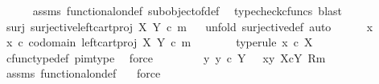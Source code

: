 \begin{isabellebody}
\ \ \ \ \isamarkupfalse%
\ assms\ functional{\isacharunderscore}{\kern0pt}on{\isacharunderscore}{\kern0pt}def\ subobject{\isacharunderscore}{\kern0pt}of{\isacharunderscore}{\kern0pt}def{}\ \isamarkupfalse%
\ {\isacharparenleft}{\kern0pt}typecheck{\isacharunderscore}{\kern0pt}cfuncs{\isacharcomma}{\kern0pt}\ blast{\isacharparenright}{\kern0pt}\isanewline
\ \ \isamarkupfalse%
\ surj{\isacharcolon}{\kern0pt}\ {\isachardoublequoteopen}surjective{\isacharparenleft}{\kern0pt}left{\isacharunderscore}{\kern0pt}cart{\isacharunderscore}{\kern0pt}proj\ X\ Y\ {\isasymcirc}\isactrlsub c\ m{\isacharparenright}{\kern0pt}{\isachardoublequoteclose}\isanewline
\ \ \isamarkupfalse%
{\isacharparenleft}{\kern0pt}unfold\ surjective{\isacharunderscore}{\kern0pt}def{\isacharcomma}{\kern0pt}\ auto{\isacharparenright}{\kern0pt}\isanewline
\ \ \ \ \isamarkupfalse%
\ x\ \isanewline
\ \ \ \ \isamarkupfalse%
\ {\isachardoublequoteopen}x\ {\isasymin}\isactrlsub c\ codomain\ {\isacharparenleft}{\kern0pt}left{\isacharunderscore}{\kern0pt}cart{\isacharunderscore}{\kern0pt}proj\ X\ Y\ {\isasymcirc}\isactrlsub c\ m{\isacharparenright}{\kern0pt}{\isachardoublequoteclose}\isanewline
\ \ \ \ \isamarkupfalse%
\ \isamarkupfalse%
\ {\isacharbrackleft}{\kern0pt}type{\isacharunderscore}{\kern0pt}rule{\isacharbrackright}{\kern0pt}{\isacharcolon}{\kern0pt}\ {\isachardoublequoteopen}x\ {\isasymin}\isactrlsub c\ X{\isachardoublequoteclose}\isanewline
\ \ \ \ \ \ \isamarkupfalse%
\ cfunc{\isacharunderscore}{\kern0pt}type{\isacharunderscore}{\kern0pt}def\ pi{}{\isacharunderscore}{\kern0pt}m{\isacharunderscore}{\kern0pt}type\ \isamarkupfalse%
\ force\isanewline
\ \ \ \ \isamarkupfalse%
\ \isamarkupfalse%
\ {\isachardoublequoteopen}{\isasymexists}{\isacharbang}{\kern0pt}\ y{\isachardot}{\kern0pt}\ {\isacharparenleft}{\kern0pt}y\ {\isasymin}\isactrlsub c\ Y\ {\isasymand}\ \ {\isasymlangle}x{\isacharcomma}{\kern0pt}y{\isasymrangle}\ {\isasymin}\isactrlbsub X{\isasymtimes}\isactrlsub cY\isactrlesub \ {\isacharparenleft}{\kern0pt}R{\isacharcomma}{\kern0pt}m{\isacharparenright}{\kern0pt}{\isacharparenright}{\kern0pt}{\isachardoublequoteclose}\isanewline
\ \ \ \ \ \ \isamarkupfalse%
\ assms\ functional{\isacharunderscore}{\kern0pt}on{\isacharunderscore}{\kern0pt}def\ \ \isamarkupfalse%
\ force\isanewline
\ \ \ \ \isamarkupfalse%
\ \isamarkupfalse%

\end{isabellebody}
